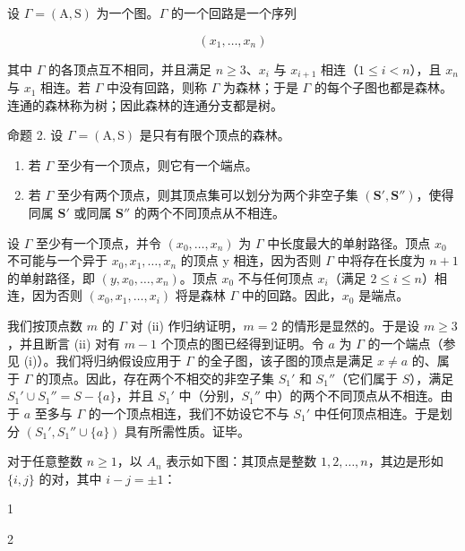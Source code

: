 
设 \(\Gamma = (\mathrm{A},\mathrm{S})\) 为一个图。\(\Gamma\) 的一个回路是一个序列

\[
(x _ {1}, \ldots , x _ {n})
\]

其中 \(\Gamma\) 的各顶点互不相同，并且满足 \(n \geqslant 3\)、\(x_{i}\) 与 \(x_{i+1}\) 相连（\(1 \leqslant i < n\)），且 \(x_{n}\) 与 \(x_{1}\) 相连。若 \(\Gamma\) 中没有回路，则称 \(\Gamma\) 为森林；于是 \(\Gamma\) 的每个子图也都是森林。连通的森林称为树；因此森林的连通分支都是树。

命题 2. 设 \(\Gamma = (\mathrm{A},\mathrm{S})\) 是只有有限个顶点的森林。

\begin{enumerate}
\def\labelenumi{(\roman{enumi})}
\item
  若 \(\Gamma\) 至少有一个顶点，则它有一个端点。
\item
  若 \(\Gamma\) 至少有两个顶点，则其顶点集可以划分为两个非空子集 \((\mathbf{S}', \mathbf{S}'')\)，使得同属 \(\mathbf{S}'\) 或同属 \(\mathbf{S}''\) 的两个不同顶点从不相连。
\end{enumerate}

设 \(\Gamma\) 至少有一个顶点，并令 \((x_{0},\ldots,x_{n})\) 为 \(\Gamma\) 中长度最大的单射路径。顶点 \(x_{0}\) 不可能与一个异于 \(x_{0},x_{1},\ldots,x_{n}\) 的顶点 y 相连，因为否则 \(\Gamma\) 中将存在长度为 \(n+1\) 的单射路径，即 \((y,x_{0},\ldots,x_{n})\)。顶点 \(x_{0}\) 不与任何顶点 \(x_{i}\)（满足 \(2\leqslant i\leqslant n\)）相连，因为否则 \((x_{0},x_{1},\ldots,x_{i})\) 将是森林 \(\Gamma\) 中的回路。因此，\(x_{0}\) 是端点。

我们按顶点数 \(m\) 的 \(\Gamma\) 对 (ii) 作归纳证明，\(m = 2\) 的情形是显然的。于是设 \(m \geqslant 3\)，并且断言 (ii) 对有 \(m - 1\) 个顶点的图已经得到证明。令 \(a\) 为 \(\Gamma\) 的一个端点（参见 (i)）。我们将归纳假设应用于 \(\Gamma\) 的全子图，该子图的顶点是满足 \(x \neq a\) 的、属于 \(\Gamma\) 的顶点。因此，存在两个不相交的非空子集 \(S_1'\) 和 \(S_1''\)（它们属于 \(S\)），满足 \(S_1' \cup S_1'' = S - \{a\}\)，并且 \(S_1'\) 中（分别，\(S_1''\) 中）的两个不同顶点从不相连。由于 \(a\) 至多与 \(\Gamma\) 的一个顶点相连，我们不妨设它不与 \(S_1'\) 中任何顶点相连。于是划分 \((S_1', S_1'' \cup \{a\})\) 具有所需性质。证毕。

对于任意整数 \(n \geqslant 1\)，以 \(A_{n}\) 表示如下图：其顶点是整数 \(1, 2, \ldots, n\)，其边是形如 \(\{i, j\}\) 的对，其中 \(i - j = \pm 1\)：

1

2

